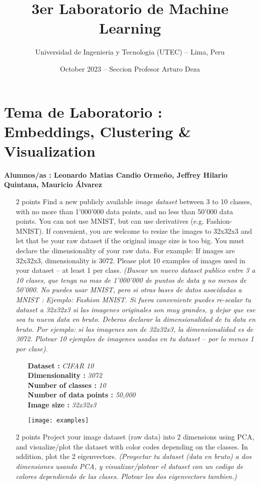 \documentclass{article}
\title{3er Laboratorio de Machine Learning}
\author{Universidad de Ingenieria y Tecnologia (UTEC) -- Lima, Peru}
\date{October 2023 -- Seccion Profesor Arturo Deza}
\begin{document}
    \maketitle
    \small

    \section*{Tema de Laboratorio : Embeddings, Clustering \& Visualization}

    \textbf{Alumnos/as : Leonardo Matias Candio Ormeño, Jeffrey Hilario Quintana, Mauricio Álvarez}

    \begin{enumerate}
        \item [2 points] Find a new publicly available \textit{image dataset} between 3 to 10 classes, with no more than 1'000'000 data points, and no less than 50'000 data points. You can not use MNIST, but can use derivatives (e.g. Fashion-MNIST). If convenient, you are welcome to resize the images to 32x32x3 and let that be your raw dataset if the original image size is too big. You must declare the dimensionality of your raw data. For example: If images are 32x32x3, dimensionality is 3072. Please plot 10 examples of images used in your dataset -- at least 1 per class. \textit{(Buscar un nuevo dataset publico entre 3 a 10 clases, que tenga no mas de 1'000'000 de puntos de data y no menos de 50'000. No puedes usar MNIST, pero si otras bases de datos asocidadas a MNIST : Ejemplo: Fashion MNIST. Si fuera conveniente puedes re-scalar tu dataset a 32x32x3 si las imagenes originales son muy grandes, y dejar que ese sea tu nueva data en bruto. Deberas declarar la dimensionalidad de tu data en bruto. Por ejemplo: si las imagenes son de 32x32x3, la dimensionalidad es de 3072. Plotear 10 ejemplos de imagenes usadas en tu dataset -- por lo menos 1 por clase)}.

        \begin{itemize}
            \item[] \textbf{Dataset :} \textit{CIFAR 10}\\ \textbf{Dimensionality :} \textit{3072} \\ \textbf{Number of classes :} \textit{10} \\ \textbf{Number of data points :} \textit{50,000} \\ \textbf{Image size :} \textit{32x32x3}
            \item[] \texttt{[image: examples]}
        \end{itemize}
        \item [2 points] Project your image dataset (raw data) into 2 dimensions using PCA, and visualize/plot the dataset with color codes depending on the classes. In addition, plot the 2 eigenvectors. \textit{(Proyectar tu dataset (data en bruto) a dos dimensiones usando PCA, y visualizar/plotear el dataset con un codigo de colores dependiendo de las clases. Plotear los dos eigenvectors tambien.)}


\end{enumerate}
\end{document}
